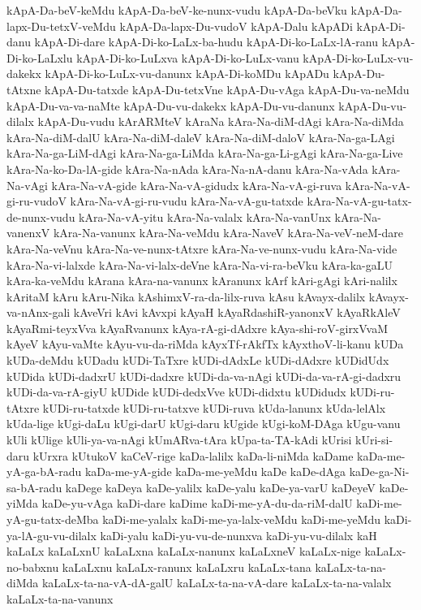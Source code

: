 {kApA-Da-beV-keMdu
kApA-Da-beV-ke-nunx-vudu
kApA-Da-beVku
kApA-Da-lapx-Du-tetxV-veMdu
kApA-Da-lapx-Du-vudoV
kApA-Dalu
kApADi
kApA-Di-danu
kApA-Di-dare
kApA-Di-ko-LaLx-ba-hudu
kApA-Di-ko-LaLx-lA-ranu
kApA-Di-ko-LaLxlu
kApA-Di-ko-LuLxva
kApA-Di-ko-LuLx-vanu
kApA-Di-ko-LuLx-vu-dakekx
kApA-Di-ko-LuLx-vu-danunx
kApA-Di-koMDu
kApADu
kApA-Du-tAtxne
kApA-Du-tatxde
kApA-Du-tetxVne
kApA-Du-vAga
kApA-Du-va-neMdu
kApA-Du-va-va-naMte
kApA-Du-vu-dakekx
kApA-Du-vu-danunx
kApA-Du-vu-dilalx
kApA-Du-vudu
kArARMteV
kAraNa
kAra-Na-diM-dAgi
kAra-Na-diMda
kAra-Na-diM-dalU
kAra-Na-diM-daleV
kAra-Na-diM-daloV
kAra-Na-ga-LAgi
kAra-Na-ga-LiM-dAgi
kAra-Na-ga-LiMda
kAra-Na-ga-Li-gAgi
kAra-Na-ga-Live
kAra-Na-ko-Da-lA-gide
kAra-Na-nAda
kAra-Na-nA-danu
kAra-Na-vAda
kAra-Na-vAgi
kAra-Na-vA-gide
kAra-Na-vA-gidudx
kAra-Na-vA-gi-ruva
kAra-Na-vA-gi-ru-vudoV
kAra-Na-vA-gi-ru-vudu
kAra-Na-vA-gu-tatxde
kAra-Na-vA-gu-tatx-de-nunx-vudu
kAra-Na-vA-yitu
kAra-Na-valalx
kAra-Na-vanUnx
kAra-Na-vanenxV
kAra-Na-vanunx
kAra-Na-veMdu
kAra-NaveV
kAra-Na-veV-neM-dare
kAra-Na-veVnu
kAra-Na-ve-nunx-tAtxre
kAra-Na-ve-nunx-vudu
kAra-Na-vide
kAra-Na-vi-lalxde
kAra-Na-vi-lalx-deVne
kAra-Na-vi-ra-beVku
kAra-ka-gaLU
kAra-ka-veMdu
kArana
kAra-na-vanunx
kAranunx
kArf
kAri-gAgi
kAri-nalilx
kAritaM
kAru
kAru-Nika
kAshimxV-ra-da-lilx-ruva
kAsu
kAvayx-dalilx
kAvayx-va-nAnx-gali
kAveVri
kAvi
kAvxpi
kAyaH
kAyaRdashiR-yanonxV
kAyaRkAleV
kAyaRmi-teyxVva
kAyaRvanunx
kAya-rA-gi-dAdxre
kAya-shi-roV-girxVvaM
kAyeV
kAyu-vaMte
kAyu-vu-da-riMda
kAyxTf-rAkfTx
kAyxthoV-li-kanu
kUDa
kUDa-deMdu
kUDadu
kUDi-TaTxre
kUDi-dAdxLe
kUDi-dAdxre
kUDidUdx
kUDida
kUDi-dadxrU
kUDi-dadxre
kUDi-da-va-nAgi
kUDi-da-va-rA-gi-dadxru
kUDi-da-va-rA-giyU
kUDide
kUDi-dedxVve
kUDi-didxtu
kUDidudx
kUDi-ru-tAtxre
kUDi-ru-tatxde
kUDi-ru-tatxve
kUDi-ruva
kUda-lanunx
kUda-lelAlx
kUda-lige
kUgi-daLu
kUgi-darU
kUgi-daru
kUgide
kUgi-koM-DAga
kUgu-vanu
kUli
kUlige
kUli-ya-va-nAgi
kUmARva-tAra
kUpa-ta-TA-kAdi
kUrisi
kUri-si-daru
kUrxra
kUtukoV
kaCeV-rige
kaDa-lalilx
kaDa-li-niMda
kaDame
kaDa-me-yA-ga-bA-radu
kaDa-me-yA-gide
kaDa-me-yeMdu
kaDe
kaDe-dAga
kaDe-ga-Ni-sa-bA-radu
kaDege
kaDeya
kaDe-yalilx
kaDe-yalu
kaDe-ya-varU
kaDeyeV
kaDe-yiMda
kaDe-yu-vAga
kaDi-dare
kaDime
kaDi-me-yA-du-da-riM-dalU
kaDi-me-yA-gu-tatx-deMba
kaDi-me-yalalx
kaDi-me-ya-lalx-veMdu
kaDi-me-yeMdu
kaDi-ya-lA-gu-vu-dilalx
kaDi-yalu
kaDi-yu-vu-de-nunxva
kaDi-yu-vu-dilalx
kaH
kaLaLx
kaLaLxnU
kaLaLxna
kaLaLx-nanunx
kaLaLxneV
kaLaLx-nige
kaLaLx-no-babxnu
kaLaLxnu
kaLaLx-ranunx
kaLaLxru
kaLaLx-tana
kaLaLx-ta-na-diMda
kaLaLx-ta-na-vA-dA-galU
kaLaLx-ta-na-vA-dare
kaLaLx-ta-na-valalx
kaLaLx-ta-na-vanunx
}
